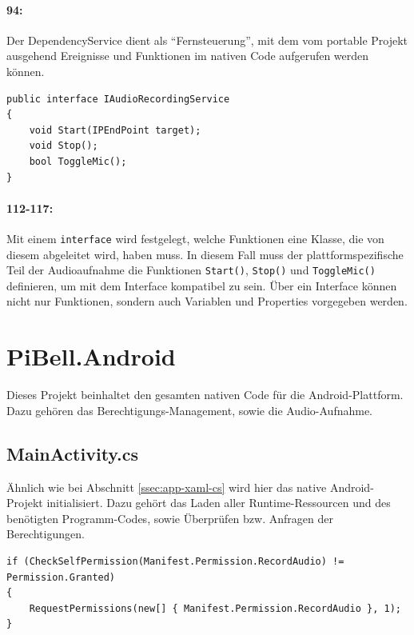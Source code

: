 \paragraph{94:} Der DependencyService dient als \enquote{Fernsteuerung}, mit dem vom portable Projekt ausgehend Ereignisse und Funktionen im nativen Code aufgerufen werden können.

\begin{verbatim}
public interface IAudioRecordingService
{
    void Start(IPEndPoint target);
    void Stop();
    bool ToggleMic();
}
\end{verbatim}
\paragraph{112-117:} Mit einem \texttt{interface} wird festgelegt, welche Funktionen eine Klasse, die von diesem abgeleitet wird, haben muss.
In diesem Fall muss der plattformspezifische Teil der Audioaufnahme die Funktionen \texttt{Start()}, \texttt{Stop()} und \texttt{ToggleMic()} definieren, um mit dem Interface kompatibel zu sein.
Über ein Interface können nicht nur Funktionen, sondern auch Variablen und Properties vorgegeben werden.


\section{PiBell.Android}
Dieses Projekt beinhaltet den gesamten nativen Code für die Android-Plattform.
Dazu gehören das Berechtigungs-Management, sowie die Audio-Aufnahme.

\subsection{MainActivity.cs}
Ähnlich wie bei Abschnitt \ref{ssec:app-xaml-cs} wird hier das native Android-Projekt initialisiert.
Dazu gehört das Laden aller Runtime-Ressourcen und des benötigten Programm-Codes, sowie Überprüfen bzw. Anfragen der Berechtigungen.
\begin{verbatim}
if (CheckSelfPermission(Manifest.Permission.RecordAudio) != Permission.Granted)
{
    RequestPermissions(new[] { Manifest.Permission.RecordAudio }, 1);
}
\end{verbatim}
